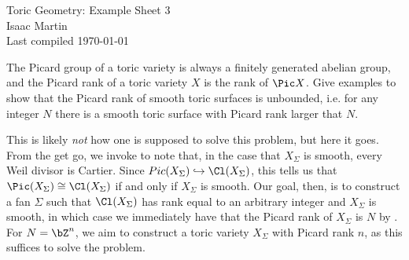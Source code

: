


\pagestyle{empty}
	\LARGE
\begin{center}
	Toric Geometry: Example Sheet 3 \\
	\Large
	Isaac Martin \\
    Last compiled \today
\end{center}
\normalsize
\vspace{-2mm}
\hru
\begin{homework}[e]
	\prob The Picard group of a toric variety is always a finitely generated abelian group, and the Picard rank of a toric variety $X$ is the rank of $\Pic X$. Give examples to show that the Picard rank of smooth toric surfaces is unbounded, i.e. for any integer $N$ there is a smooth toric surface with Picard rank larger that $N$.
	\begin{prf}
		This is likely \emph{not} how one is supposed to solve this problem, but here it goes. From the get go, we invoke \cite[Proposition 4.2.6.]{Cox-Little-Schenck} to note that, in the case that $X_\Sigma$ is smooth, every Weil divisor is Cartier. Since $Pic(X_\Sigma) \hookrightarrow \Cl(X_\Sigma)$, this tells us that $\Pic(X_\Sigma) \cong \Cl(X_\Sigma)$ if and only if $X_\Sigma$ is smooth. Our goal, then, is to construct a fan $\Sigma$ such that $\Cl(X_\Sigma)$ has rank equal to an arbitrary integer and $X_\Sigma$ is smooth, in which case we immediately have that the Picard rank of $X_\Sigma$ is $N$ by \cite[Proposition 4.2.6.]{Cox-Little-Schenck}. For $N = \bZ^n$, we aim to construct a toric variety $X_\Sigma$ with Picard rank $n$, as this suffices to solve the problem.


\end{prf}
\end{homework}
